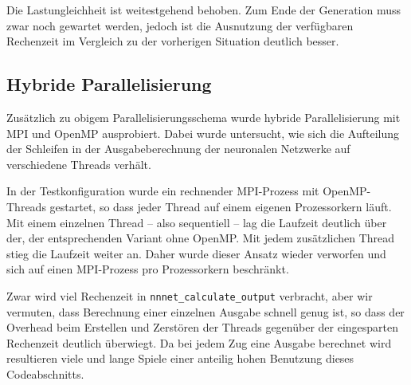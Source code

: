 Die Lastungleichheit ist weitestgehend behoben. Zum Ende der Generation muss
zwar noch gewartet werden, jedoch ist die Ausnutzung der verfügbaren Rechenzeit
im Vergleich zu der vorherigen Situation deutlich besser.

\subsection{Hybride Parallelisierung}
Zusätzlich zu obigem Parallelisierungsschema wurde hybride Parallelisierung mit
MPI und OpenMP ausprobiert.  Dabei wurde untersucht, wie sich die Aufteilung
der Schleifen in der Ausgabeberechnung der neuronalen Netzwerke auf
verschiedene Threads verhält.

In der Testkonfiguration wurde ein rechnender MPI-Prozess mit OpenMP-Threads
gestartet, so dass jeder Thread auf einem eigenen Prozessorkern läuft.  Mit
einem einzelnen Thread -- also sequentiell -- lag die Laufzeit deutlich über
der, der entsprechenden Variant ohne OpenMP.  Mit jedem zusätzlichen Thread
stieg die Laufzeit weiter an. Daher wurde dieser Ansatz wieder verworfen und
sich auf einen MPI-Prozess pro Prozessorkern beschränkt.

Zwar wird viel Rechenzeit in \texttt{nnnet\_calculate\_output} verbracht, aber
wir vermuten, dass Berechnung einer einzelnen Ausgabe schnell genug ist, so
dass der Overhead beim Erstellen und Zerstören der Threads gegenüber der
eingesparten Rechenzeit deutlich überwiegt. Da bei jedem Zug eine Ausgabe
berechnet wird resultieren viele und lange Spiele einer anteilig hohen
Benutzung dieses Codeabschnitts.
